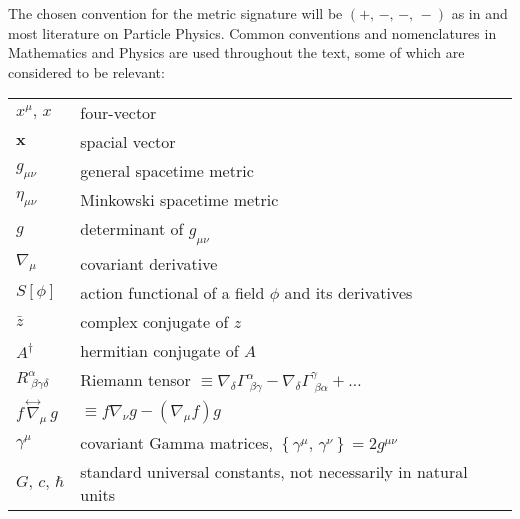 
The chosen convention for the metric signature will be $(+,\,-,\,-,\,-)$ as in \cite{BirrelDavies} and most literature on Particle Physics. Common conventions and nomenclatures in Mathematics and Physics are used throughout the text, some of which are considered to be relevant:\newline

\begin{tabular}{p{1.75cm}p{11cm}}
	
	$x^\mu,\,x$ & four-vector \\
	$\mathbf{x}$ & spacial vector \\
	$g_{\mu\nu}$ & general spacetime metric \\
	$\eta_{\mu\nu}$ & Minkowski spacetime metric \\
	$g$ & determinant of $g_{\mu\nu}$ \\
	$\nabla_\mu$ & covariant derivative \\
	$S[\phi]$ & action functional of a field $\phi$ and its derivatives \\
	$\bar{z}$ & complex conjugate of $z$ \\
	$A^\dagger$ & hermitian conjugate of $A$\\
	$R^\alpha_{\;\beta\gamma\delta}$ & Riemann tensor \quad $\equiv \nabla_\delta\Gamma^\alpha_{\;\beta\gamma}-\nabla_\delta\Gamma^\gamma_{\;\beta\alpha}+\hdots$\\
	$f\,\overset{\leftrightarrow}{\nabla}_\mu\, g$ &$\equiv f\nabla_\nu g-\left(\nabla_\mu f\right)g$ \\
	$\gamma^\mu$ & covariant Gamma matrices, $\left\{\gamma^\mu,\,\gamma^\nu\right\}=2g^{\mu\nu}$ \\
	$G,\,c,\,\hbar$ & standard universal constants, not necessarily in natural units \\
	
\end{tabular}

